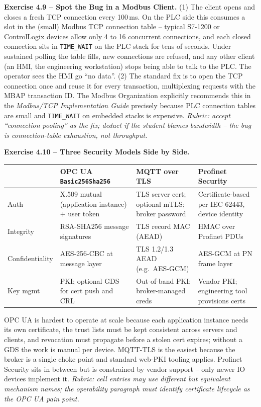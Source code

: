 \documentclass[11pt,a4paper]{article}
\begin{document}
\begin{solutionbox}
\textbf{Exercise 4.9 -- Spot the Bug in a Modbus Client.}
(1) The client opens and closes a fresh TCP connection every 100\,ms. On
the PLC side this consumes a slot in the (small) Modbus TCP connection
table -- typical S7-1200 or ControlLogix devices allow only 4 to 16
concurrent connections, and each closed connection sits in
\texttt{TIME\_WAIT} on the PLC stack for tens of seconds. Under sustained
polling the table fills, new connections are refused, and any other client
(an HMI, the engineering workstation) stops being able to talk to the PLC.
The operator sees the HMI go ``no data''.
(2) The standard fix is to open the TCP connection once and reuse it for
every transaction, multiplexing requests with the MBAP transaction ID. The
Modbus Organization explicitly recommends this in the
\emph{Modbus/TCP Implementation Guide} precisely because PLC connection
tables are small and \texttt{TIME\_WAIT} on embedded stacks is expensive.
\textit{Rubric: accept ``connection pooling'' as the fix; deduct if the
student blames bandwidth -- the bug is connection-table exhaustion, not
throughput.}
\end{solutionbox}

\begin{solutionbox}
\textbf{Exercise 4.10 -- Three Security Models Side by Side.}
\begin{center}\small
\begin{tabular}{p{2.4cm}p{3.6cm}p{3.6cm}p{3.6cm}}
\toprule
 & \textbf{OPC UA \texttt{Basic256Sha256}} & \textbf{MQTT over TLS} & \textbf{Profinet Security} \\
\midrule
Auth & X.509 mutual (application instance) $+$ user token & TLS server cert; optional mTLS; broker password & Certificate-based per IEC 62443, device identity \\
Integrity & RSA-SHA256 message signatures & TLS record MAC (AEAD) & HMAC over Profinet PDUs \\
Confidentiality & AES-256-CBC at message layer & TLS 1.2/1.3 AEAD (e.g.\ AES-GCM) & AES-GCM at PN frame layer \\
Key mgmt & PKI; optional GDS for cert push and CRL & Out-of-band PKI; broker-managed creds & Vendor PKI; engineering tool provisions certs \\
\bottomrule
\end{tabular}
\end{center}
OPC UA is hardest to operate at scale because each application instance
needs its own certificate, the trust lists must be kept consistent across
servers and clients, and revocation must propagate before a stolen cert
expires; without a GDS the work is manual per device. MQTT-TLS is the
easiest because the broker is a single choke point and standard web-PKI
tooling applies. Profinet Security sits in between but is constrained by
vendor support -- only newer IO devices implement it.
\textit{Rubric: cell entries may use different but equivalent mechanism
names; the operability paragraph must identify certificate lifecycle as the
OPC UA pain point.}
\end{solutionbox}
\end{document}

